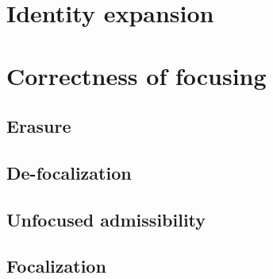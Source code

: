 \section{Identity expansion}
\label{sec:ord-identity}

\section{Correctness of focusing}
\label{sec:ord-correctness}

\subsection{Erasure}

\subsection{De-focalization}

\subsection{Unfocused admissibility}

\subsection{Focalization}


